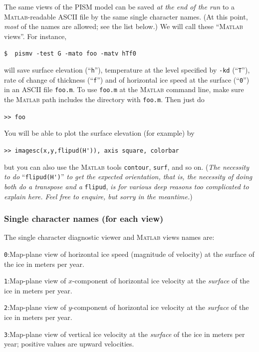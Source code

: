 \documentclass[11pt,final]{amsart}
\renewcommand{\t}[1]{\texttt{#1}}
\newcommand{\Matlab}{\textsc{Matlab}\xspace}
\begin{document}
The same views of the PISM model can be saved \emph{at the end of the run} to a \Matlab-readable ASCII file by the same single character names.  (At this point, \emph{most} of the names are allowed; see the list below.)  We will call these ``\Matlab views''.  For instance,

\verb|$  pismv -test G -mato foo -matv hTf0|

\noindent will save surface elevation (``\t{h}''), temperature at the level specified by \t{-kd} (``\t{T}''), rate of change of thickness (``\t{f}'') and of horizontal ice speed at the surface (``\t{0}'') in an ASCII file \verb|foo.m|.  To use \verb|foo.m| at the \Matlab command line, make sure the \Matlab path includes the directory with \verb|foo.m|.  Then just do

\verb|>> foo|

\noindent You will be able to plot the surface elevation (for example) by

\verb|>> imagesc(x,y,flipud(H')), axis square, colorbar|

\noindent but you can also use the \Matlab tools \verb|contour|, \verb|surf|, and so on.  (\emph{The necessity to do} ``\verb|flipud(H')|'' \emph{to get the expected orientation, that is, the necessity of doing both do a transpose \emph{and} a} \verb|flipud|, \emph{is for various deep reasons too complicated to explain here.  Feel free to enquire, but \emph{sorry} in the meantime.})


\subsubsection*{Single character names (for each view)}  The single character diagnostic viewer and \Matlab views names are:
\newcommand{\notMat}{(\emph{NOT available as a} \Matlab \emph{view}.)\xspace\xspace}

\verb|0|:\quad Map-plane view of horizontal ice speed (magnitude of velocity) at the surface of the ice in meters per year.

\verb|1|:\quad Map-plane view of $x$-component of horizontal ice velocity at the \emph{surface} of the ice in meters per year.

\verb|2|:\quad Map-plane view of $y$-component of horizontal ice velocity at the \emph{surface} of the ice in meters per year.

\verb|3|:\quad Map-plane view of vertical ice velocity at the \emph{surface} of the ice in meters per year; positive values are upward velocities.
\end{document}
